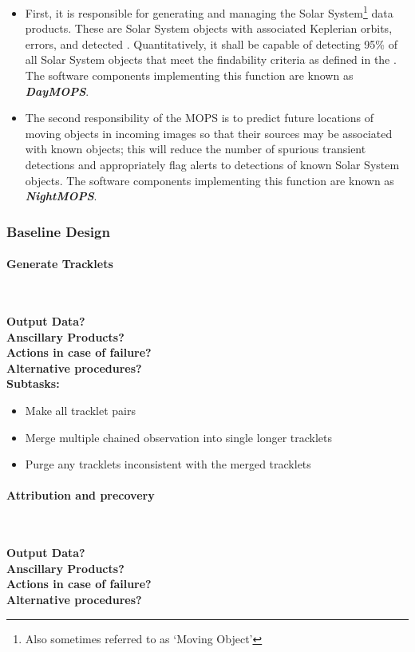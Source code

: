 \begin{itemize}
    \item First, it is responsible for generating and managing the Solar System\footnote{Also sometimes referred to as `Moving Object'} data products. These are Solar System objects with associated Keplerian orbits, errors, and detected \DIASources. Quantitatively, it shall be capable of detecting 95\% of all Solar System objects that meet the findability criteria as defined in the \OSS\@. The software components implementing this function are known as {\bf \em DayMOPS}.
    \item The second responsibility of the MOPS is to predict future locations of moving objects in incoming images so that their sources may be associated with known objects; this will reduce the number of spurious transient detections and appropriately flag alerts to detections of known Solar System objects.  The software components implementing this function are known as {\bf \em NightMOPS}.
\end{itemize}

\subsubsection{Baseline Design}
\paragraph{Generate Tracklets}~

\noindent
{\bf Output Data?}\\
{\bf Anscillary Products?}\\
{\bf Actions in case of failure?}\\
{\bf Alternative procedures?}\\

\noindent
{\bf Subtasks:}
\begin{itemize}
\item Make all tracklet pairs
\item Merge multiple chained observation into single longer tracklets
\item Purge any tracklets inconsistent with the merged tracklets
\end{itemize}

\paragraph{Attribution and precovery}~

\noindent
{\bf Output Data?}\\
{\bf Anscillary Products?}\\
{\bf Actions in case of failure?}\\
{\bf Alternative procedures?}\\

